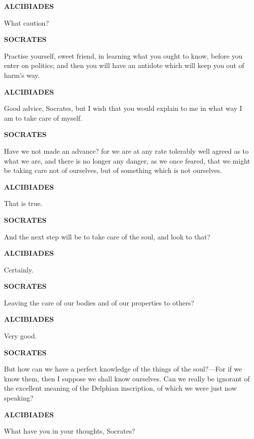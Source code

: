 \documentclass[11pt,letter]{article}
\begin{document}
\par \textbf{ALCIBIADES}
\par   What caution?

\par \textbf{SOCRATES}
\par   Practise yourself, sweet friend, in learning what you ought to know, before you enter on politics; and then you will have an antidote which will keep you out of harm's way.

\par \textbf{ALCIBIADES}
\par   Good advice, Socrates, but I wish that you would explain to me in what way I am to take care of myself.

\par \textbf{SOCRATES}
\par   Have we not made an advance? for we are at any rate tolerably well agreed as to what we are, and there is no longer any danger, as we once feared, that we might be taking care not of ourselves, but of something which is not ourselves.

\par \textbf{ALCIBIADES}
\par   That is true.

\par \textbf{SOCRATES}
\par   And the next step will be to take care of the soul, and look to that?

\par \textbf{ALCIBIADES}
\par   Certainly.

\par \textbf{SOCRATES}
\par   Leaving the care of our bodies and of our properties to others?

\par \textbf{ALCIBIADES}
\par   Very good.

\par \textbf{SOCRATES}
\par   But how can we have a perfect knowledge of the things of the soul?—For if we know them, then I suppose we shall know ourselves. Can we really be ignorant of the excellent meaning of the Delphian inscription, of which we were just now speaking?

\par \textbf{ALCIBIADES}
\par   What have you in your thoughts, Socrates?
\end{document}
